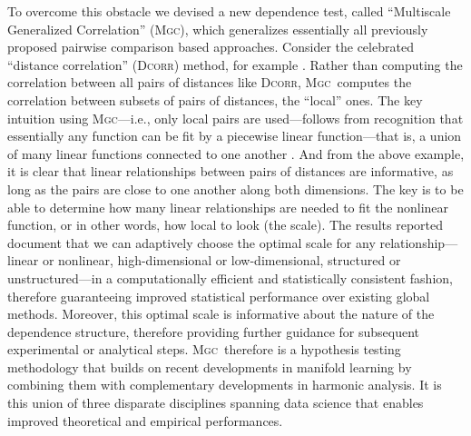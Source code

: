 \documentclass[11pt]{article}
\providecommand{\sct}[1]{{\normalfont\textsc{#1}}}
\newcommand{\Mgc}{\sct{Mgc}}
\newcommand{\Dcorr}{\sct{Dcorr}}
\begin{document}
To overcome this obstacle we devised a new dependence test, called ``Multiscale Generalized Correlation'' (\Mgc), which generalizes essentially all previously proposed pairwise comparison based approaches.   
Consider the celebrated ``distance correlation'' (\Dcorr) method, for example \cite{SzekelyRizzo2009}.  Rather than computing the correlation between all pairs of distances like \Dcorr, \Mgc~computes the correlation between subsets of pairs of distances, the ``local'' ones.
The key intuition using \Mgc---i.e., only local pairs are used---follows from recognition that essentially any function can be fit by a piecewise linear function---that is, a union of many linear functions connected to one another \cite{Allard2012}. 
And from the above example, it is clear that linear relationships between pairs of distances are informative, as long as the pairs are close to one another along both dimensions.
The key is to be able to determine how many linear relationships are needed to fit the nonlinear function, or in other words, how local to look (the scale).  
The results reported document that we can adaptively choose the optimal scale for any relationship---linear or nonlinear, high-dimensional or low-dimensional, structured or unstructured---in a computationally efficient and statistically consistent fashion, therefore guaranteeing improved statistical performance over existing global methods. Moreover, this optimal scale is  informative about the nature of the dependence structure, therefore providing further guidance for subsequent experimental or analytical steps. \Mgc~therefore is a hypothesis testing methodology that builds on recent developments in manifold learning by combining them with complementary developments in harmonic analysis.  It is this union of three disparate disciplines spanning data science that enables improved theoretical and empirical performances.  
\end{document}
